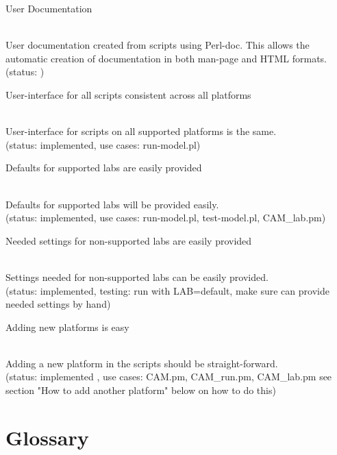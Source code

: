 \documentclass[]{article}
\begin{document}
\begin{enumerate}
{\bf\em \item User Documentation}\\
User documentation created from scripts using Perl-doc. This allows the automatic
creation of documentation in both man-page and HTML formats.
(status: )

{\bf\em \item User-interface for all scripts consistent across all platforms}\\
User-interface for scripts on all supported platforms is the same.\\
(status: implemented, use cases: run-model.pl)

{\bf\em \item Defaults for supported labs are easily provided}\\
Defaults for supported labs will be provided easily. \\
(status: implemented, use cases: run-model.pl, test-model.pl, CAM\_lab.pm)

{\bf\em \item Needed settings for non-supported labs are easily provided}\\
Settings needed for non-supported labs can be easily provided. \\
(status: implemented, testing: run with LAB=default, make sure can provide needed settings 
by hand)

{\bf\em \item Adding new platforms is easy}\\
Adding a new platform in the scripts should be straight-forward. \\
(status: implemented , use cases: CAM.pm, CAM\_run.pm, CAM\_lab.pm see
section "How to add another platform" below on how to do this) 


\end{enumerate}

\section{Glossary}
\end{document}
